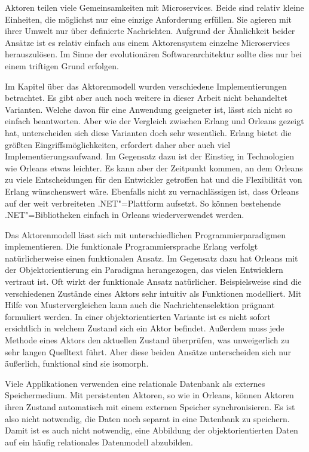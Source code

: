 Aktoren teilen viele Gemeinsamkeiten mit Microservices. Beide sind relativ kleine Einheiten, die möglichst nur eine einzige Anforderung erfüllen. Sie agieren mit ihrer Umwelt nur über definierte Nachrichten. Aufgrund der Ähnlichkeit beider Ansätze ist es relativ einfach aus einem Aktorensystem einzelne Microservices herauszulösen. Im Sinne der evolutionären Softwarearchitektur sollte dies nur bei einem triftigen Grund erfolgen.

Im Kapitel über das Aktorenmodell wurden verschiedene Implementierungen betrachtet. Es gibt aber auch noch weitere in dieser Arbeit nicht behandeltet Varianten. Welche davon für eine Anwendung geeigneter ist, lässt sich nicht so einfach beantworten. Aber wie der Vergleich zwischen Erlang und Orleans gezeigt hat, unterscheiden sich diese Varianten doch sehr wesentlich. Erlang bietet die größten Eingriffsmöglichkeiten, erfordert daher aber auch viel Implementierungsaufwand. Im Gegensatz dazu ist der Einstieg in Technologien wie Orleans etwas leichter. Es kann aber der Zeitpunkt kommen, an dem Orleans zu viele Entscheidungen für den Entwickler getroffen hat und die Flexibilität von Erlang wünschenswert wäre. Ebenfalls nicht zu vernachlässigen ist, dass Orleans auf der weit verbreiteten .NET"=Plattform aufsetzt. So können bestehende .NET"=Bibliotheken einfach in Orleans wiederverwendet werden.

Das Aktorenmodell lässt sich mit unterschiedlichen Programmierparadigmen implementieren. Die funktionale Programmiersprache Erlang verfolgt natürlicherweise einen funktionalen Ansatz. Im Gegensatz dazu hat Orleans mit der Objektorientierung ein Paradigma herangezogen, das vielen Entwicklern vertraut ist. Oft wirkt der funktionale Ansatz natürlicher. Beispielsweise sind die verschiedenen Zustände eines Aktors sehr intuitiv als Funktionen modelliert. Mit Hilfe von Mustervergleichen kann auch die Nachrichtenselektion prägnant formuliert werden. In einer objektorientierten Variante ist es nicht sofort ersichtlich in welchem Zustand sich ein Aktor befindet. Außerdem muss jede Methode eines Aktors den aktuellen Zustand überprüfen, was unweigerlich zu sehr langen Quelltext führt. Aber diese beiden Ansätze unterscheiden sich nur äußerlich, funktional sind sie isomorph.

Viele Applikationen verwenden eine relationale Datenbank als externes Speichermedium. Mit persistenten Aktoren, so wie in Orleans, können Aktoren ihren Zustand automatisch mit einem externen Speicher synchronisieren. Es ist also nicht notwendig, die Daten noch separat in eine Datenbank zu speichern. Damit ist es auch nicht notwendig, eine Abbildung der objektorientierten Daten auf ein häufig relationales Datenmodell abzubilden.

